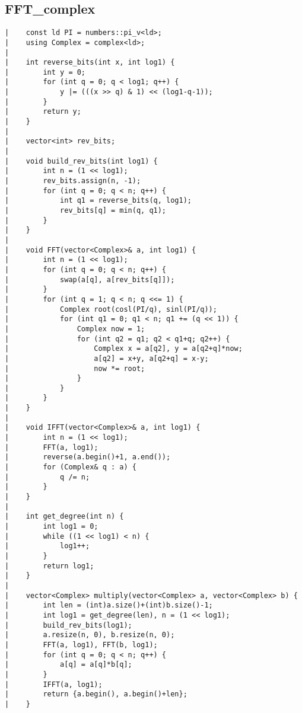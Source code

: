 \documentclass[a4paper, 10pt]{article}
\begin{document}
\begin{center}
\section*{FFT\_complex}
\begin{verbatim}
|    const ld PI = numbers::pi_v<ld>;
|    using Complex = complex<ld>;
|    
|    int reverse_bits(int x, int log1) {
|        int y = 0;
|        for (int q = 0; q < log1; q++) {
|            y |= (((x >> q) & 1) << (log1-q-1));
|        }
|        return y;
|    }
|    
|    vector<int> rev_bits;
|    
|    void build_rev_bits(int log1) {
|        int n = (1 << log1);
|        rev_bits.assign(n, -1);
|        for (int q = 0; q < n; q++) {
|            int q1 = reverse_bits(q, log1);
|            rev_bits[q] = min(q, q1);
|        }
|    }
|    
|    void FFT(vector<Complex>& a, int log1) {
|        int n = (1 << log1);
|        for (int q = 0; q < n; q++) {
|            swap(a[q], a[rev_bits[q]]);
|        }
|        for (int q = 1; q < n; q <<= 1) {
|            Complex root(cosl(PI/q), sinl(PI/q));
|            for (int q1 = 0; q1 < n; q1 += (q << 1)) {
|                Complex now = 1;
|                for (int q2 = q1; q2 < q1+q; q2++) {
|                    Complex x = a[q2], y = a[q2+q]*now;
|                    a[q2] = x+y, a[q2+q] = x-y;
|                    now *= root;
|                }
|            }
|        }
|    }
|    
|    void IFFT(vector<Complex>& a, int log1) {
|        int n = (1 << log1);
|        FFT(a, log1);
|        reverse(a.begin()+1, a.end());
|        for (Complex& q : a) {
|            q /= n;
|        }
|    }
|    
|    int get_degree(int n) {
|        int log1 = 0;
|        while ((1 << log1) < n) {
|            log1++;
|        }
|        return log1;
|    }
|    
|    vector<Complex> multiply(vector<Complex> a, vector<Complex> b) {
|        int len = (int)a.size()+(int)b.size()-1;
|        int log1 = get_degree(len), n = (1 << log1);
|        build_rev_bits(log1);
|        a.resize(n, 0), b.resize(n, 0);
|        FFT(a, log1), FFT(b, log1);
|        for (int q = 0; q < n; q++) {
|            a[q] = a[q]*b[q];
|        }
|        IFFT(a, log1);
|        return {a.begin(), a.begin()+len};
|    }
\end{verbatim}


\end{center}
\end{document}
